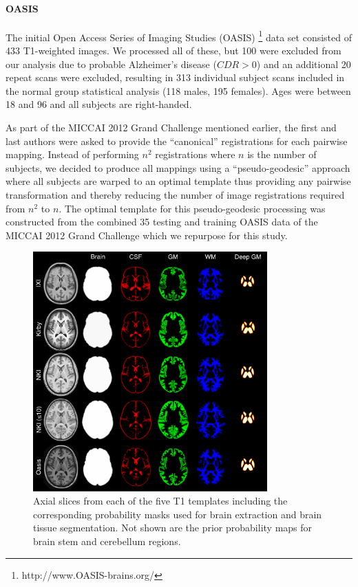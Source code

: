\paragraph{OASIS}
The initial Open Access Series of Imaging Studies (OASIS)%
\footnote{
http://www.OASIS-brains.org/
}
data set consisted of 433 T1-weighted images.  We processed all of these,
but 100 were excluded from our analysis due to probable Alzheimer's
disease ($CDR > 0$) and an additional 20 repeat scans were excluded,
 resulting in 313 individual subject scans included in the normal group statistical
analysis (118 males, 195 females).  Ages were between 18 and 96 and 
all subjects are right-handed.  

As part of the MICCAI 2012 Grand Challenge mentioned earlier, the first and
last authors were asked to provide the ``canonical'' registrations for each
pairwise mapping.  Instead of performing $n^2$ registrations where $n$ is
the number of subjects, we decided to produce all mappings using a 
``pseudo-geodesic'' approach where all subjects are warped to an optimal
template thus providing any pairwise transformation and thereby 
reducing the number of image registrations required from $n^2$ to $n$.
The optimal template for this pseudo-geodesic processing was constructed 
from the combined 35 testing and training OASIS data of the MICCAI 2012 Grand 
Challenge which we repurpose for this study.

\begin{figure}
  \centering
  \includegraphics[width=90mm]{Figures/templateProbabilityMasks.pdf}
  \caption{Axial slices from each of the five T1 templates including the corresponding
  probability masks used for brain extraction and brain tissue segmentation.  Not shown
  are the prior probability maps for brain stem and cerebellum regions.
  }
  \label{fig:templateMasks}
\end{figure}


